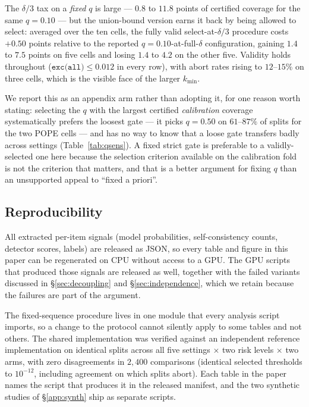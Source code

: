 \documentclass[review,number,doubleblind]{elsarticle}
\theoremstyle{plain}
\theoremstyle{definition}
\theoremstyle{remark}
\begin{document}
The $\delta/3$ tax on a \emph{fixed} $q$ is large --- $0.8$ to $11.8$ points of certified coverage
for the same $q=0.10$ --- but the union-bound version earns it back by being allowed to select:
averaged over the ten cells, the fully valid select-at-$\delta/3$ procedure costs $+0.50$ points
relative to the reported $q=0.10$-at-full-$\delta$ configuration, gaining $1.4$ to $7.5$ points
on five cells and losing $1.4$ to $4.2$ on the other five. Validity holds throughout
($\texttt{exc(all)}\le0.012$ in every row), with abort rates rising to $12$--$15\%$ on three
cells, which is the visible face of the larger $k_{\min}$.

We report this as an appendix arm rather than adopting it, for one reason worth stating:
selecting the $q$ with the largest certified \emph{calibration} coverage systematically prefers
the loosest gate --- it picks $q=0.50$ on $61$--$87\%$ of splits for the two POPE cells --- and has
no way to know that a loose gate transfers badly across settings (Table~\ref{tab:qsens}). A fixed
strict gate is preferable to a validly-selected one here because the selection criterion
available on the calibration fold is not the criterion that matters, and that is a better
argument for fixing $q$ than an unsupported appeal to ``fixed a priori''.

\subsection{Reproducibility}
All extracted per-item signals (model probabilities, self-consistency counts, detector
scores, labels) are released as JSON, so every table and figure in this paper can be
regenerated on CPU without access to a GPU. The GPU scripts that produced those signals are
released as well, together with the failed variants discussed in \S\ref{sec:decoupling} and
\S\ref{sec:independence}, which we retain because the failures are part of the argument.

The fixed-sequence procedure lives in one module that every analysis script imports, so a change
to the protocol cannot silently apply to some tables and not others. The shared implementation was
verified against an independent reference implementation on identical splits across all five
settings $\times$ two risk levels $\times$ two arms, with zero disagreements in $2{,}400$
comparisons (identical selected thresholds to $10^{-12}$, including agreement on which splits
abort). Each table in the paper names the script that produces it in the released manifest, and
the two synthetic studies of \S\ref{app:synth} ship as separate scripts.




\end{document}
